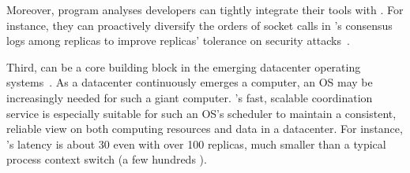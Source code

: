 Moreover, program analyses developers can tightly integrate their tools with 
\xxx. For instance, they can proactively diversify the orders of socket calls 
in \xxx's consensus logs among replicas to improve replicas' tolerance on 
security attacks~\cite{con:hotpar12}.

% 


Third, \xxx can be a core building block in the emerging datacenter operating 
systems~\cite{matei:hotcloud11, mesos:nsdi11, datacenter:os}. As a 
datacenter continuously emerges a computer, an OS may be increasingly needed for 
such a giant computer. \xxx's fast, scalable coordination service is especially 
suitable for such an OS's scheduler to maintain a consistent, reliable view on 
both computing resources and data in a datacenter. For instance, \xxx's 
latency is about 30 \us even with over 100 replicas, much smaller than a 
typical process context switch (a few hundreds \us).
